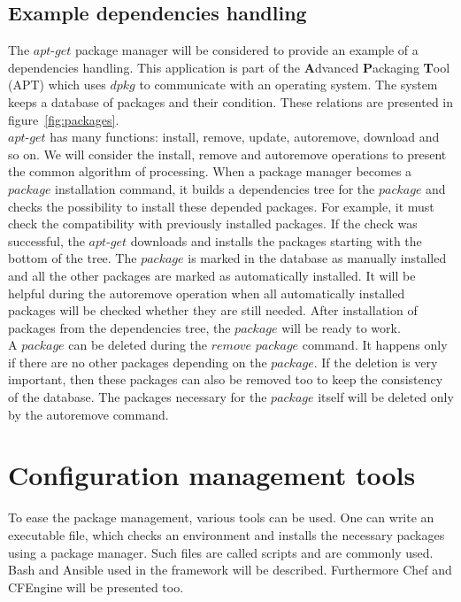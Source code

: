 \subsection*{Example dependencies handling}
The $apt$-$get$ package manager will be considered to provide an example of a dependencies handling.
This application is part of the \textbf{A}dvanced \textbf{P}ackaging \textbf{T}ool (APT) which uses $dpkg$ to communicate with an operating system.
The system keeps a database of packages and their condition.
These relations are presented in figure~\ref{fig:packages}.\\
$apt$-$get$ has many functions: install, remove, update, autoremove, download and so on.
We will consider the install, remove and autoremove operations to present the common algorithm of processing.
When a package manager becomes a $package$ installation command, it builds a dependencies tree for the $package$ and checks the possibility to install these depended packages.
For example, it must check the compatibility with previously installed packages. 
If the check was successful, the $apt$-$get$ downloads and installs the packages starting with the bottom of the tree.
The $package$ is marked in the database as manually installed and all the other packages are marked as automatically installed. 
It will be helpful during the autoremove operation when all automatically installed packages will be checked whether they are still needed.
After installation of packages from the dependencies tree, the $package$ will be ready to work.\\
A $package$ can be deleted during the $remove$ $package$ command.
It happens only if there are no other packages depending on the $package$. 
If the deletion is very important, then these packages can also be removed too to keep the consistency of the database. 
The packages necessary for the $package$ itself will be deleted only by the autoremove command.



\section{Configuration management tools}
To ease the package management, various tools can be used. 
One can write an executable file, which checks an environment and installs the necessary packages using a package manager.
Such files are called scripts and are commonly used.
Bash and Ansible used in the framework will be described.
Furthermore Chef and CFEngine will be presented too.

